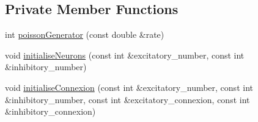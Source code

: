 \subsection*{Private Member Functions}
\begin{DoxyCompactItemize}
\item 
int \hyperlink{classNetwork_a2ca8d812c87a17d0391f8db5061a1b75}{poisson\-Generator} (const double \&rate)
\item 
void \hyperlink{classNetwork_a370614351bf7c2ae2134c3de2a0b1b59}{initialise\-Neurons} (const int \&excitatory\-\_\-number, const int \&inhibitory\-\_\-number)
\item 
void \hyperlink{classNetwork_a673ead2bf1a9446f7cb1eac2e42bfc0d}{initialise\-Connexion} (const int \&excitatory\-\_\-number, const int \&inhibitory\-\_\-number, const int \&excitatory\-\_\-connexion, const int \&inhibitory\-\_\-connexion)
\end{DoxyCompactItemize}
